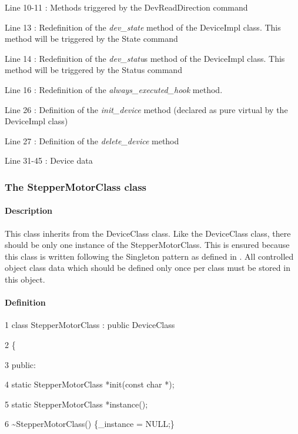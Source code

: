Line 10-11 : Methods triggered by the DevReadDirection command

Line 13 : Redefinition of the \emph{dev\_state}
method of the DeviceImpl class. This method will be triggered by the
State command

Line 14 : Redefinition of the \emph{dev\_statu}s
method of the DeviceImpl class. This method will be triggered by the
Status command

Line 16 : Redefinition of the \emph{always\_executed\_hook}
method.

Line 26 : Definition of the \emph{init\_device}
method (declared as pure virtual by the DeviceImpl class)

Line 27 : Definition of the \emph{delete\_device}
method

Line 31-45 : Device data


\subsubsection{The StepperMotorClass class}


\paragraph{Description}

This class inherits from the DeviceClass class.
Like the DeviceClass class, there should be only one instance of the
StepperMotorClass. This is ensured because this class is written following
the Singleton pattern as defined in \cite{Patterns}.
All controlled object class data which should be defined only once
per class must be stored in this object.


\paragraph{Definition }



     1  class StepperMotorClass : public DeviceClass

     2  \{

3  public:

     4          static StepperMotorClass {*}init(const char {*});

     5          static StepperMotorClass {*}instance();

     6          \textasciitilde{}StepperMotorClass() \{\_instance
= NULL;\}

